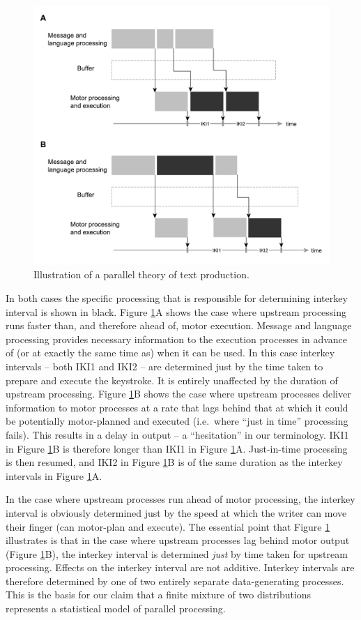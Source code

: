 \documentclass[
  man,floatsintext]{apa7}
\begin{document}
\begin{figure}[!htb]
  \centering
  \includegraphics{figures/cascade_figure.pdf}
  \caption{Illustration of a parallel theory of text production.}
  \label{fig:model}
\end{figure}

In both cases the specific processing that is responsible for determining interkey interval is shown in black. Figure \ref{fig:model}A shows the case where upstream processing runs faster than, and therefore ahead of, motor execution. Message and language processing provides necessary information to the execution processes in advance of (or at exactly the same time as) when it can be used. In this case interkey intervals -- both IKI1 and IKI2 -- are determined just by the time taken to prepare and execute the keystroke. It is entirely unaffected by the duration of upstream processing. Figure \ref{fig:model}B shows the case where upstream processes deliver information to motor processes at a rate that lags behind that at which it could be potentially motor-planned and executed (i.e.~where \enquote{just in time} processing fails). This results in a delay in output -- a \enquote{hesitation} in our terminology. IKI1 in Figure \ref{fig:model}B is therefore longer than IKI1 in Figure \ref{fig:model}A. Just-in-time processing is then resumed, and IKI2 in Figure \ref{fig:model}B is of the same duration as the interkey intervals in Figure \ref{fig:model}A.

In the case where upstream processes run ahead of motor processing, the interkey interval is obviously determined just by the speed at which the writer can move their finger (can motor-plan and execute). The essential point that Figure \ref{fig:model} illustrates is that in the case where upstream processes lag behind motor output (Figure \ref{fig:model}B), the interkey interval is determined \emph{just} by time taken for upstream processing. Effects on the interkey interval are not additive. Interkey intervals are therefore determined by one of two entirely separate data-generating processes. This is the basis for our claim that a finite mixture of two distributions represents a statistical model of parallel processing.
\end{document}
